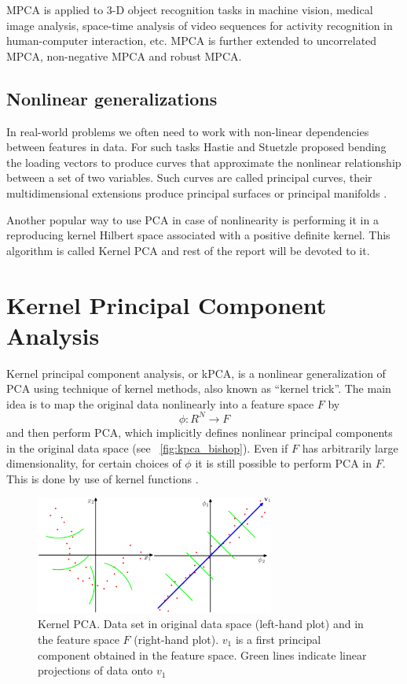 MPCA is applied to 3-D object recognition tasks \citep{sahambi} in machine vision, medical image analysis, space-time analysis of video sequences for activity recognition \citep{green} in human-computer interaction, etc.  MPCA is further extended to uncorrelated MPCA, non-negative MPCA and robust MPCA.

\subsection{Nonlinear generalizations}
In real-world problems we often need to work with non-linear dependencies between features in data. For such tasks Hastie and Stuetzle \citep{hastie} proposed bending the loading
vectors to produce curves that approximate the nonlinear relationship between
a set of two variables. Such curves are called principal curves, their multidimensional extensions produce principal surfaces or principal manifolds \citep{gorban}.

Another popular way to use PCA in case of nonlinearity is performing it in a reproducing kernel Hilbert space associated with a positive definite kernel. 
This algorithm is called Kernel PCA and rest of the report will be devoted to it.

\section{Kernel Principal Component Analysis}
Kernel principal component analysis, or kPCA, is a nonlinear generalization of PCA using technique of kernel methods, also known as ``kernel trick''. The main idea is to map the original data nonlinearly into a feature space $F$ by 
\begin{equation}
\phi: R^N \rightarrow F 
\end{equation}
and then perform PCA, which implicitly defines nonlinear
principal components in the original data space (see ~\autoref{fig:kpca_bishop}). Even if $F$ has arbitrarily large dimensionality, for certain choices of $\phi$ it is still possible to perform PCA in $F$. This is done by use of kernel functions \citep*{original_paper}.

\begin{figure}[ht]
	\centering
	\includegraphics[width=0.7\textwidth]{img/kpca_example_from_bishop.png}
	\caption{\label{fig:kpca_bishop}Kernel PCA. Data set in original data space (left-hand plot) and in the feature space $F$ (right-hand plot). \boldmath$v_1$ is a first principal component obtained in the feature space. Green lines indicate linear projections of data onto \boldmath$v_1$ \citep{bishop}}
\end{figure}


